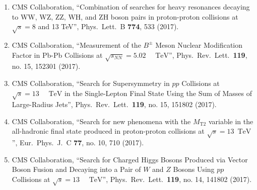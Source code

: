\begin{itemize}
\begin{enumerate}
\item CMS Collaboration, ``Combination of searches for heavy resonances decaying to WW, WZ, ZZ, WH, and ZH boson pairs in proton-proton collisions at $\sqrt{s}=8$ and 13 TeV'', Phys.\ Lett.\ B {\bf 774}, 533 (2017).

\item CMS Collaboration, ``Measurement of the ${B}^{\pm}$ Meson Nuclear Modification Factor in Pb-Pb Collisions at $\sqrt{{s}_{NN}}=5.02\text{ }\text{ }\mathrm{TeV}$'', Phys.\ Rev.\ Lett.\  {\bf 119}, no. 15, 152301 (2017).

\item CMS Collaboration, ``Search for Supersymmetry in $pp$ Collisions at $\sqrt{s}=13\text{ }\text{ }\mathrm{TeV}$ in the Single-Lepton Final State Using the Sum of Masses of Large-Radius Jets'', Phys.\ Rev.\ Lett.\  {\bf 119}, no. 15, 151802 (2017).

\item CMS Collaboration, ``Search for new phenomena with the $M_{\mathrm {T2}}$ variable in the all-hadronic final state produced in proton-proton collisions at $\sqrt{s} = 13$ $\,\text {TeV}$'', Eur.\ Phys.\ J.\ C {\bf 77}, no. 10, 710 (2017).

\item CMS Collaboration, ``Search for Charged Higgs Bosons Produced via Vector Boson Fusion and Decaying into a Pair of $W$ and $Z$ Bosons Using $pp$ Collisions at $\sqrt{s}=13\text{ }\text{ }\mathrm{TeV}$'', Phys.\ Rev.\ Lett.\  {\bf 119}, no. 14, 141802 (2017).


\end{enumerate}
\end{itemize}
